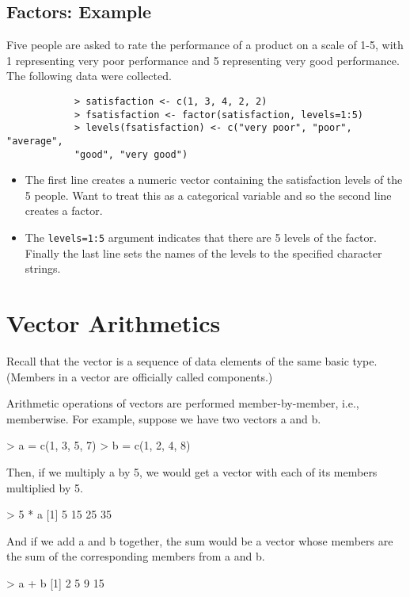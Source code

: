 \begin{itemize}
\begin{frame}
		\subsection{Factors: Example}
		Five people are asked to rate the performance of a product on a
		scale of 1-5, with 1 representing very poor performance and 5
		representing very good performance. The following data were
		collected.
		\begin{framed}
			\begin{verbatim}
			> satisfaction <- c(1, 3, 4, 2, 2)
			> fsatisfaction <- factor(satisfaction, levels=1:5)
			> levels(fsatisfaction) <- c("very poor", "poor", "average",
			"good", "very good")
			\end{verbatim}
		\end{framed}
		\begin{itemize}
			\item The first line creates a numeric vector containing the satisfaction
			levels of the 5 people. Want to treat this as a categorical variable
			and so the second line creates a factor. 
			\item The \texttt{levels=1:5} argument
			indicates that there are 5 levels of the factor. Finally the last line
			sets the names of the levels to the specified character strings.
		\end{itemize}
	\section{Vector Arithmetics}

Recall that the vector is a sequence of data elements of the same basic type. (Members in a vector are officially called components.)

Arithmetic operations of vectors are performed member-by-member, i.e., memberwise. For example, suppose we have two vectors a and b.

> a = c(1, 3, 5, 7) 
> b = c(1, 2, 4, 8)

Then, if we multiply a by 5, we would get a vector with each of its members multiplied by 5.

> 5 * a 
[1]  5 15 25 35

And if we add a and b together, the sum would be a vector whose members are the sum of the corresponding members from a and b.

> a + b 
[1]  2  5  9 15


\end{frame}
\end{itemize}
